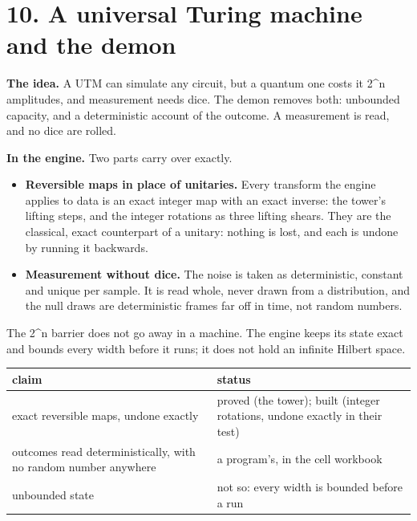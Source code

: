 \section{\texorpdfstring{10. A universal Turing machine and the demon}{10. A universal Turing machine and the demon}}

\textbf{The idea.} A UTM can simulate any circuit, but a quantum one costs it 2\textasciicircum{}n amplitudes, and measurement needs dice. The demon removes both: unbounded capacity, and a deterministic account of the outcome. A measurement is read, and no dice are rolled.

\textbf{In the engine.} Two parts carry over exactly.

\begin{itemize}
\item \textbf{Reversible maps in place of unitaries.} Every transform the engine applies to data is an exact integer map with an exact inverse: the tower's lifting steps, and the integer rotations as three lifting shears. They are the classical, exact counterpart of a unitary: nothing is lost, and each is undone by running it backwards.
\item \textbf{Measurement without dice.} The noise is taken as deterministic, constant and unique per sample. It is read whole, never drawn from a distribution, and the null draws are deterministic frames far off in time, not random numbers.
\end{itemize}

The 2\textasciicircum{}n barrier does not go away in a machine. The engine keeps its state exact and bounds every width before it runs; it does not hold an infinite Hilbert space.

{\small
\setlength{\tabcolsep}{6pt}
\begin{longtable}{>{\RaggedRight\arraybackslash}p{}>{\RaggedRight\arraybackslash}p{}}
\toprule
claim & status \\
\midrule
\endhead
exact reversible maps, undone exactly & proved (the tower); built (integer rotations, undone exactly in their test) \\
outcomes read deterministically, with no random number anywhere & a program's, in the cell workbook \\
unbounded state & not so: every width is bounded before a run \\
\bottomrule
\end{longtable}
}

